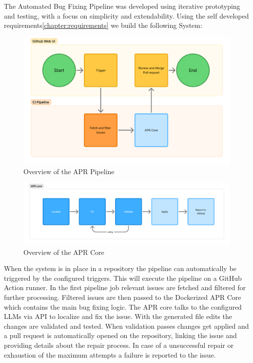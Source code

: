 The Automated Bug Fixing Pipeline was developed using iterative prototyping and testing, with a focus on simplicity and extendability. Using the self developed requirements\ref{chapter:requirements} we build the following System:

\begin{figure}[H]
    \centering
    \includegraphics[width=1\textwidth]{images/flowcharts/overview.png}
    \caption{Overview of the APR Pipeline}
    \label{fig:high-level}
\end{figure}

\begin{figure}[H]
    \centering
    \includegraphics[width=1\textwidth]{images/flowcharts/apr_core_overview.png}
    \caption{Overview of the APR Core}
    \label{fig:apr-core-overview}
\end{figure}

When the system is in place in a repository the pipeline can automatically be triggered by the configured triggers. This will execute the pipeline on a GitHub Action runner. In the first pipeline job relevant issues are fetched and filtered for further processing. Filtered issues are then passed to the Dockerized APR Core which contains the main bug fixing logic. The APR core talks to the configured LLMs via API to localize and fix the issue. With the generated file edits the changes are validated and tested. When validation passes changes get applied and a pull request is automatically opened on the repository, linking the issue and providing details about the repair process. In case of a unsuccessful repair or exhaustion of the maximum attempts a failure is reported to the issue.


